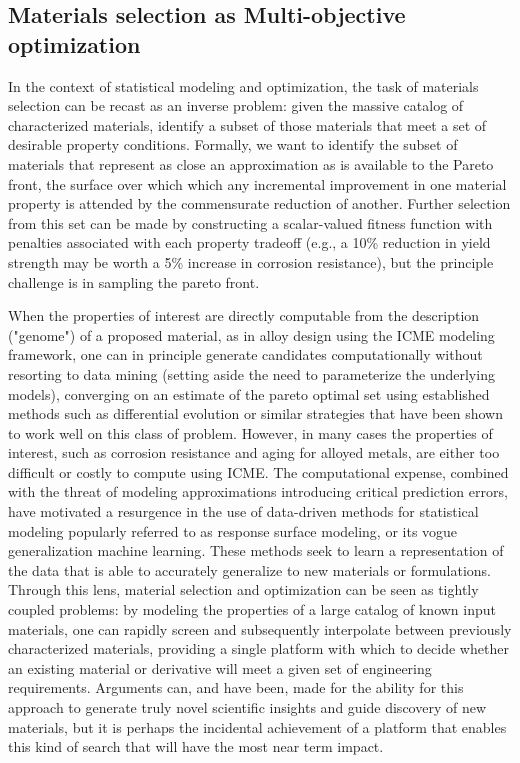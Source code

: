 \subsection{Materials selection as Multi-objective optimization}
In the context of statistical modeling and optimization, the task of materials selection can be recast as an inverse problem: given the massive catalog of characterized materials, identify a subset of those materials that meet a set of desirable property conditions.
Formally, we want to identify the subset of materials that represent as close an approximation as is available to the Pareto front\cite{Sirisalee2004,Fonseca1993}, the surface over which which any incremental improvement in one material property is attended by the commensurate reduction of another. 
Further selection from this set can be made by constructing a scalar-valued fitness function with penalties associated with each property tradeoff (e.g., a 10\% reduction in yield strength may be worth a 5\% increase in corrosion resistance), but the principle challenge is in sampling the pareto front.

When the properties of interest are directly computable from the description ("genome") of a proposed material, as in alloy design using the ICME modeling framework, one can in principle generate candidates computationally without resorting to data mining (setting aside the need to parameterize the underlying models), converging on an estimate of the pareto optimal set using established methods such as differential evolution or similar strategies that have been shown to work well on this class of problem\cite{Zhang2015}.
However, in many cases the properties of interest, such as corrosion resistance and aging for alloyed metals\cite{Konter2016}, are either too difficult or costly to compute using ICME. 
The computational expense, combined with the threat of modeling approximations introducing critical prediction errors, have motivated a resurgence in the use of data-driven methods for statistical modeling popularly referred to as response surface modeling, or its vogue generalization machine learning\cite{Rajan2013,Agrawal2014,Suh2006,Jee2000}.
These methods seek to learn a representation of the data that is able to accurately generalize to new materials or formulations. 
Through this lens, material selection and optimization can be seen as tightly coupled problems: by modeling the properties of a large catalog of known input materials, one can rapidly screen and subsequently interpolate between previously characterized materials, providing a single platform with which to decide whether an existing material or derivative will meet a given set of engineering requirements.
Arguments can, and have been\cite{Rajan2005,Hemanth2011}, made for the ability for this approach to generate truly novel scientific insights and guide discovery of new materials, but it is perhaps the incidental achievement of a platform that enables this kind of search that will have the most near term impact.

